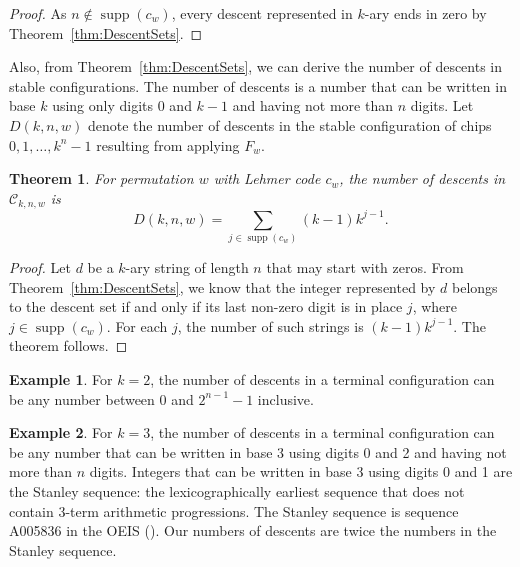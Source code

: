 \documentclass[final]{dmtcs-episciences}
\newtheorem{theorem}{Theorem}[section]
\theoremstyle{definition}
\newtheorem{example}{Example}
\theoremstyle{remark}
\DeclareMathOperator{\supp}{supp}
\begin{document}
\begin{proof}
    As $n \not\in \supp(c_w)$, every descent represented in $k$-ary ends in zero by Theorem~\ref{thm:DescentSets}.
\end{proof}

Also, from Theorem~\ref{thm:DescentSets}, we can derive the number of descents in stable configurations. The number of descents is a number that can be written in base $k$ using only digits 0 and $k-1$ and having not more than $n$ digits. Let $D(k, n, w)$ denote the number of descents in the stable configuration of chips $0, 1, \dots, k^n-1$ resulting from applying $F_w.$

\begin{theorem}\label{thm:DescentNumbers}
For permutation $w$ with Lehmer code $c_w$, the number of descents in $\mathcal{C}_{k, n, w}$ is
\[D(k, n, w) = \sum_{j \in \supp(c_w)} (k-1) k^{j-1}.\]
\end{theorem}

\begin{proof}
    Let $d$ be a $k$-ary string of length $n$ that may start with zeros. From Theorem~\ref{thm:DescentSets}, we know that the integer represented by $d$ belongs to the descent set if and only if its last non-zero digit is in place $j$, where $j \in \supp(c_w)$. For each $j$, the number of such strings is $(k-1)k^{j-1}$. The theorem follows.
\end{proof}





\begin{example}
\label{ex:descents2}
For $k=2$, the number of descents in a terminal configuration can be any number between 0 and $2^{n-1}-1$ inclusive.
\end{example}

\begin{example}
    For $k=3$, the number of descents in a terminal configuration can be any number that can be written in base 3 using digits 0 and 2 and having not more than $n$ digits. Integers that can be written in base 3 using digits 0 and 1 are the Stanley sequence: the lexicographically earliest sequence that does not contain 3-term arithmetic progressions. The Stanley sequence is sequence A005836 in the OEIS (\cite{oeis}). Our numbers of descents are twice the numbers in the Stanley sequence.
\end{example}
\end{document}
